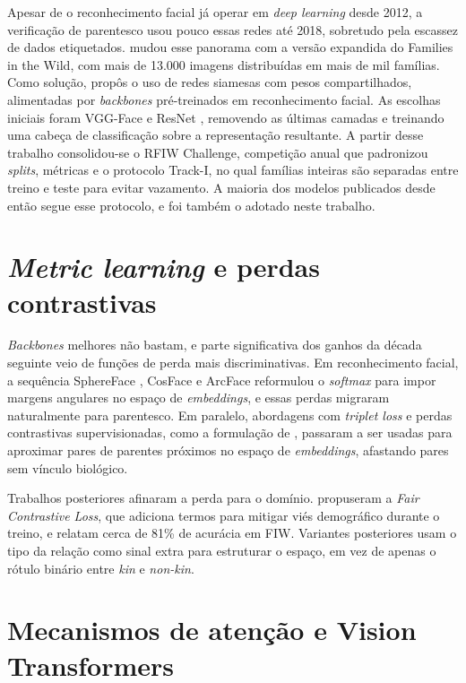Apesar de o reconhecimento facial já operar em \textit{deep learning} desde 2012, a verificação de parentesco usou pouco essas redes até 2018, sobretudo pela escassez de dados etiquetados.  mudou esse panorama com a versão expandida do Families in the Wild, com mais de 13.000 imagens distribuídas em mais de mil famílias. Como solução, propôs o uso de redes siamesas com pesos compartilhados, alimentadas por \textit{backbones} pré-treinados em reconhecimento facial. As escolhas iniciais foram VGG-Face \cite{parkhi2015deep} e ResNet \cite{wen2016discriminative}, removendo as últimas camadas e treinando uma cabeça de classificação sobre a representação resultante. A partir desse trabalho consolidou-se o RFIW Challenge,
competição anual que padronizou \textit{splits}, métricas e o protocolo Track-I, no qual famílias inteiras são separadas entre treino e teste para evitar vazamento. A maioria dos modelos publicados desde então segue esse protocolo, e foi também o adotado neste trabalho.

\section{\textit{Metric learning} e perdas contrastivas}

\textit{Backbones} melhores não bastam, e parte significativa dos ganhos da década seguinte veio de funções de perda mais discriminativas. Em reconhecimento facial, a sequência SphereFace \cite{liu2017sphereface},
CosFace \cite{wang2018cosface}
e ArcFace \cite{deng2019arcface}
reformulou o \textit{softmax} para impor margens angulares no espaço de \textit{embeddings}, e essas perdas migraram naturalmente para parentesco. Em paralelo, abordagens com \textit{triplet loss} \cite{schroff2015facenet}
e perdas contrastivas supervisionadas, como a formulação de ,
passaram a ser usadas para aproximar pares de parentes próximos no espaço de \textit{embeddings}, afastando pares sem vínculo biológico.

Trabalhos posteriores afinaram a perda para o domínio. 
propuseram a \textit{Fair Contrastive Loss}, que adiciona termos para mitigar viés demográfico durante o treino, e relatam cerca de 81\% de acurácia em FIW. Variantes posteriores usam o tipo da relação como sinal extra para estruturar o espaço, em vez de apenas o rótulo binário entre \textit{kin} e \textit{non-kin}.

\section{Mecanismos de atenção e Vision Transformers}

